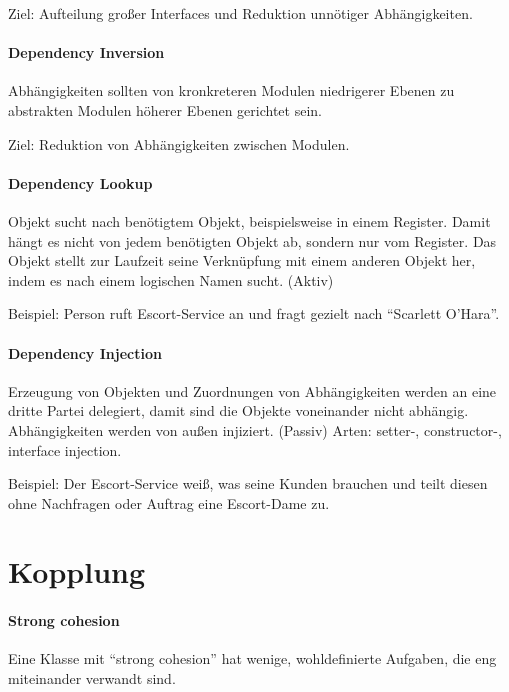Ziel: Aufteilung großer Interfaces und Reduktion unnötiger
Abhängigkeiten.

\paragraph{Dependency Inversion}\label{dependency-inversion}

Abhängigkeiten sollten von kronkreteren Modulen niedrigerer Ebenen zu
abstrakten Modulen höherer Ebenen gerichtet sein.

Ziel: Reduktion von Abhängigkeiten zwischen Modulen.

\paragraph{Dependency Lookup}\label{dependency-lookup}

Objekt sucht nach benötigtem Objekt, beispielsweise in einem Register.
Damit hängt es nicht von jedem benötigten Objekt ab, sondern nur vom
Register. Das Objekt stellt zur Laufzeit seine Verknüpfung mit einem
anderen Objekt her, indem es nach einem logischen Namen sucht. (Aktiv)

Beispiel: Person ruft Escort-Service an und fragt gezielt nach
``Scarlett O'Hara''.

\paragraph{Dependency Injection}\label{dependency-injection}

Erzeugung von Objekten und Zuordnungen von Abhängigkeiten werden an eine
dritte Partei delegiert, damit sind die Objekte voneinander nicht
abhängig. Abhängigkeiten werden von außen injiziert. (Passiv)
Arten: setter-, constructor-, interface injection.

Beispiel: Der Escort-Service weiß, was seine Kunden brauchen und teilt
diesen ohne Nachfragen oder Auftrag eine Escort-Dame zu.

\section{Kopplung}\label{kopplung}

\paragraph{Strong cohesion}\label{strong-cohesion}

Eine Klasse mit ``strong cohesion'' hat wenige, wohldefinierte Aufgaben,
die eng miteinander verwandt sind.

